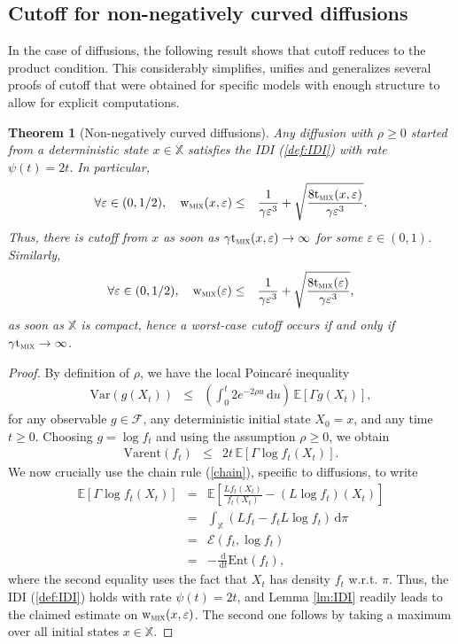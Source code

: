 \documentclass[12pt,final]{article}
\newtheorem{theorem}{Theorem}[section]
\numberwithin{equation}{section}
\newcommand{\EE}{{\mathbb{E}}}
\newcommand{\Ent}{\mathrm{Ent}}
\newcommand{\Varent}{\mathrm{Varent}}
\newcommand{\Var}{\mathrm{Var}}
\newcommand{\dd}{\,\mathrm{d}}
\newcommand{\cE}{\mathscr {E}}
\newcommand{\cF}{\mathcal {F}}
\newcommand{\dX}{\mathbb{X}}
\newcommand{\tmix}{{\rm t}_{\textsc{mix}}}
\newcommand{\wmix}{{\rm w}_{\textsc{mix}}}
\begin{document}
\subsection{Cutoff for non-negatively curved diffusions}
In the case of diffusions, the following result shows that cutoff reduces to the product condition. This considerably simplifies, unifies and generalizes several proofs of cutoff that were obtained for specific models with enough structure to allow for explicit computations. %
\begin{theorem}[Non-negatively curved diffusions]\label{th:cutoffdiff}Any diffusion with $\rho\ge 0$ started from a deterministic  state $x\in\dX$ satisfies the IDI (\ref{def:IDI})  with rate 
$
\psi(t) =  2t.
$
In particular, 
\begin{eqnarray*}
\forall\varepsilon\in(0,1/2),\quad \wmix(x,\varepsilon) & \le & \frac{1}{\gamma\varepsilon^3}+\sqrt{\frac{8\tmix(x,\varepsilon)}{\gamma\varepsilon^3}}.
\end{eqnarray*}
Thus,  there is cutoff from $x$ as soon as $\gamma\tmix(x,\varepsilon)\to\infty$ for some $\varepsilon\in(0,1)$. Similarly,
\begin{eqnarray*}
\forall\varepsilon\in(0,1/2),\quad \wmix(\varepsilon) & \le & \frac{1}{\gamma\varepsilon^3}+\sqrt{\frac{8\tmix(\varepsilon)}{\gamma\varepsilon^3}},
\end{eqnarray*}
as soon as $\dX$ is compact, hence a worst-case cutoff occurs if and only if $\gamma\tmix\to\infty$.
\end{theorem}
\begin{proof}By definition of $\rho$, we have the local Poincaré inequality 
\begin{eqnarray*}
\Var(g(X_t)) & \le & \left(\int_0^t2e^{-2\rho u}\dd u\right)\,\EE[\Gamma g(X_t)],
\end{eqnarray*}
for any observable $g\in\cF$, any deterministic initial state $X_0=x$, and any time $t\ge 0$. Choosing $g=\log f_t$ and using the assumption $\rho\ge 0$, we obtain
\begin{eqnarray*}
\Varent(f_t) & \le & 2t\,\EE[\Gamma \log f_t(X_t)].
\end{eqnarray*}
We now crucially use the chain rule (\ref{chain}), specific to diffusions, to write
\begin{eqnarray*}
\EE[\Gamma \log f_t(X_t)] & = & \EE\left[\frac{Lf_t(X_t)}{f_t(X_t)}-(L\log f_t)(X_t)\right]\\
& =&  \int_{\dX}\left({Lf_t}-f_t L\log f_t \right)\dd\pi\\
& = & \cE(f_t,\log f_t)\\
& = & -\frac{\dd}{\dd t}\Ent(f_t),
\end{eqnarray*}
where the second equality uses the fact that $X_t$ has density $f_t$ w.r.t. $\pi$. Thus, the  IDI (\ref{def:IDI}) holds with rate $\psi(t)={2t}$, and  Lemma \ref{lm:IDI} readily leads to the claimed estimate on $\wmix(x,\varepsilon)$. The second one follows by taking a maximum over all initial states $x\in\dX$.
\end{proof}
\end{document}
